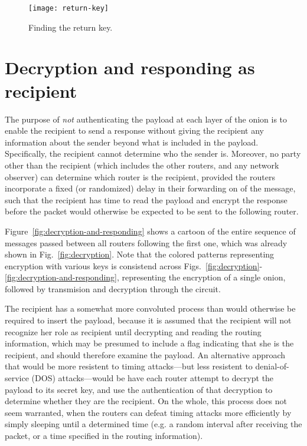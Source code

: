 \documentclass[letterpaper,twocolumn,amsmath,amssymb,pre,aps,10pt]{revtex4-1}
\begin{document}
\begin{figure*}
  \begin{center}
    \texttt{[image: return-key]}
  \end{center}
  \caption{Finding the return key.}\label{fig:return-key}
\end{figure*}

\section{Decryption and responding as recipient}

The purpose of \emph{not} authenticating the payload at each layer of
the onion is to enable the recipient to send a response without giving
the recipient any information about the sender beyond what is included
in the payload.  Specifically, the recipient cannot determine who the
sender is.  Moreover, no party other than the recipient (which
includes the other routers, and any network observer) can determine
which router is the recipient, provided the routers incorporate a
fixed (or randomized) delay in their forwarding on of the message,
such that the recipient has time to read the payload and encrypt the
response before the packet would otherwise be expected to be sent to
the following router.

Figure~\ref{fig:decryption-and-responding} shows a cartoon of the
entire sequence of messages passed between all routers following the
first one, which was already shown in Fig.~\ref{fig:decryption}.  Note
that the colored patterns representing encryption with various keys is
consistend across
Figs.~\ref{fig:decryption}-\ref{fig:decryption-and-responding},
representing the encryption of a single onion, followed by transmision
and decryption through the circuit.

The recipient has a somewhat more convoluted process than would
otherwise be required to insert the payload, because it is assumed
that the recipient will not recognize her role as recipient until
decrypting and reading the routing information, which may be presumed
to include a flag indicating that she is the recipient, and should
therefore examine the payload.  An alternative approach that would be
more resistent to timing attacks---but less resistent to
denial-of-service (DOS) attacks---would be have each router attempt to
decrypt the payload to its secret key, and use the authentication of
that decryption to determine whether they are the recipient.  On the
whole, this process does not seem warranted, when the routers can
defeat timing attacks more efficiently by simply sleeping until a
determined time (e.g. a random interval after receiving the packet, or
a time specified in the routing information).
\end{document}
